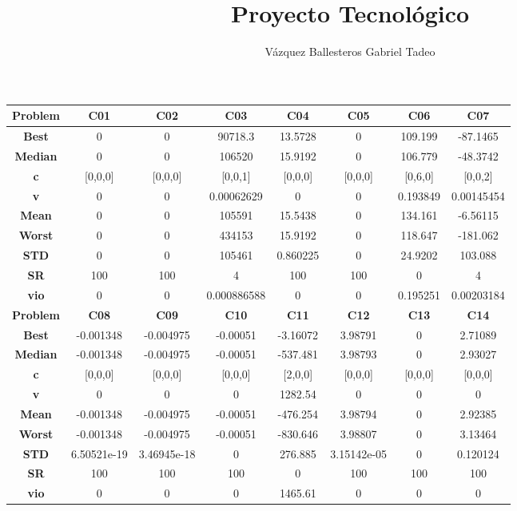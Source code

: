 \documentclass{IEEEtran}
\title{Proyecto Tecnológico}
\author{Vázquez Ballesteros Gabriel Tadeo}
\begin{document}
\onecolumn

\begin{center} 
  \begin{tabular}{|c|c|c|c|c|c|c|c|}
    \hline 
    \textbf{Problem} & \textbf{C01} & \textbf{C02} & \textbf{C03} & \textbf{C04} & \textbf{C05} & \textbf{C06} & \textbf{C07} \\ 
    \hline\hline 
    \textbf{Best} & 0 & 0 & 90718.3 & 13.5728 & 0 & 109.199 & -87.1465\\ 
    \textbf{Median} & 0 & 0 & 106520 & 15.9192 & 0 & 106.779 & -48.3742\\ 
    \textbf{c} & [0,0,0] & [0,0,0] & [0,0,1] & [0,0,0] & [0,0,0] & [0,6,0] & [0,0,2]\\ 
    \textbf{v} & 0 & 0 & 0.00062629 & 0 & 0 & 0.193849 & 0.00145454\\ 
    \textbf{Mean} & 0 & 0 & 105591 & 15.5438 & 0 & 134.161 & -6.56115\\ 
    \textbf{Worst} & 0 & 0 & 434153 & 15.9192 & 0 & 118.647 & -181.062\\ 
    \textbf{STD} & 0 & 0 & 105461 & 0.860225 & 0 & 24.9202 & 103.088\\ 
    \textbf{SR} & 100 & 100 & 4 & 100 & 100 & 0 & 4\\ 
    \textbf{vio} & 0 & 0 & 0.000886588 & 0 & 0 & 0.195251 & 0.00203184\\ 
    \hline 
    \hline 
    \textbf{Problem} & \textbf{C08} & \textbf{C09} & \textbf{C10} & \textbf{C11} & \textbf{C12} & \textbf{C13} & \textbf{C14} \\ 
    \hline\hline 
    \textbf{Best} & -0.001348 & -0.004975 & -0.00051 & -3.16072 & 3.98791 & 0 & 2.71089\\ 
    \textbf{Median} & -0.001348 & -0.004975 & -0.00051 & -537.481 & 3.98793 & 0 & 2.93027\\ 
    \textbf{c} & [0,0,0] & [0,0,0] & [0,0,0] & [2,0,0] & [0,0,0] & [0,0,0] & [0,0,0]\\ 
    \textbf{v} & 0 & 0 & 0 & 1282.54 & 0 & 0 & 0\\ 
    \textbf{Mean} & -0.001348 & -0.004975 & -0.00051 & -476.254 & 3.98794 & 0 & 2.92385\\ 
    \textbf{Worst} & -0.001348 & -0.004975 & -0.00051 & -830.646 & 3.98807 & 0 & 3.13464\\ 
    \textbf{STD} & 6.50521e-19 & 3.46945e-18 & 0 & 276.885 & 3.15142e-05 & 0 & 0.120124\\ 
    \textbf{SR} & 100 & 100 & 100 & 0 & 100 & 100 & 100\\ 
    \textbf{vio} & 0 & 0 & 0 & 1465.61 & 0 & 0 & 0\\ 

\end{tabular}
\end{center}
\end{document}
